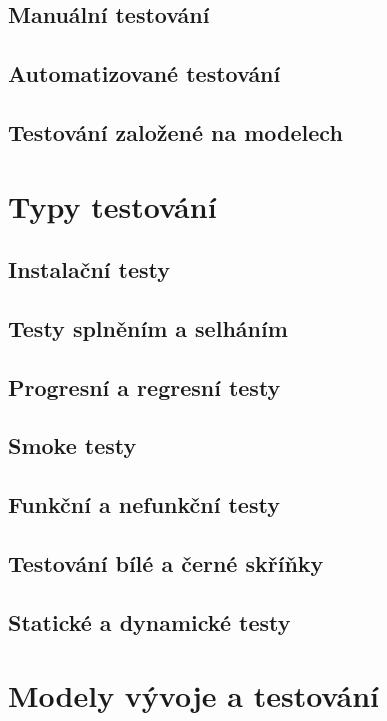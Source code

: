 \subsection{Manuální testování}
\subsection{Automatizované testování}
\subsection{Testování založené na modelech}


\section{Typy testování}

\subsection{Instalační testy}

\subsection{Testy splněním a selháním}
\subsection{Progresní a regresní testy}
\subsection{Smoke testy}
\subsection{Funkční a nefunkční testy}
\subsection{Testování bílé a černé skříňky}
\subsection{Statické a dynamické testy}

\section{Modely vývoje a testování}

\endinput

